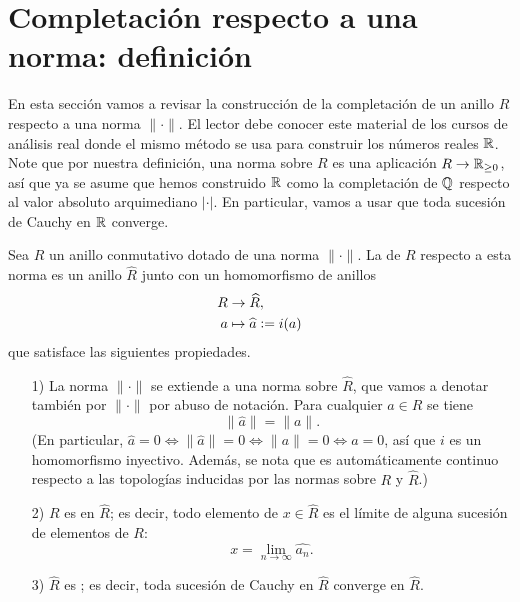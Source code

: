 \documentclass{article}
\numberwithin{equation}{section}
\theoremstyle{definition}
\begin{document}

\section{Completación respecto a una norma: definición}

En esta sección vamos a revisar la construcción de la completación de un anillo
$R$ respecto a una norma $\|\cdot\|$. El lector debe conocer este material
de los cursos de análisis real donde el mismo método se usa para construir
los números reales $\mathbb{R}$. Note que por nuestra definición, una norma sobre $R$
es una aplicación $R\to \mathbb{R}_{\ge 0}$, así que ya se asume que hemos construido
$\mathbb{R}$ como la completación de $\mathbb{Q}$ respecto al valor absoluto arquimediano
$|\cdot|$. En particular, vamos a usar que toda sucesión de Cauchy en $\mathbb{R}$
converge.

\begin{definicion}
  Sea $R$ un anillo conmutativo dotado de una norma $\|\cdot\|$.
  La  de $R$ respecto a esta norma es un anillo $\widehat{R}$
  junto con un homomorfismo de anillos
  \begin{align*}
    R & \to \widehat{R},\\
    a & \mapsto \widehat{a} \mathrel{\mathop:}= i (a)
  \end{align*}
  que satisface las siguientes propiedades.

  \begin{enumerate}
  \item[1)] La norma $\|\cdot\|$ se extiende a una norma sobre $\widehat{R}$,
    que vamos a denotar también por $\|\cdot\|$ por abuso de notación. Para
    cualquier $a\in R$ se tiene
    $$\|\widehat{a}\| = \|a\|.$$
    (En particular,
    $\widehat{a} = 0 \iff \|\widehat{a}\| = 0 \iff \|a\| = 0 \iff a = 0$, así
    que $i$ es un homomorfismo inyectivo. Además, se nota que es automáticamente
    continuo respecto a las topologías inducidas por las normas sobre $R$ y
    $\widehat{R}$.)

  \item[2)] $R$ es  en $\widehat{R}$; es decir, todo elemento de
    $x\in \widehat{R}$ es el límite de alguna sucesión de elementos de $R$:
    $$x = \lim_{n\to\infty} \widehat{a_n}.$$

  \item[3)] $\widehat{R}$ es ; es decir, toda sucesión de Cauchy
    en $\widehat{R}$ converge en $\widehat{R}$.
  \end{enumerate}
\end{definicion}
\end{document}
